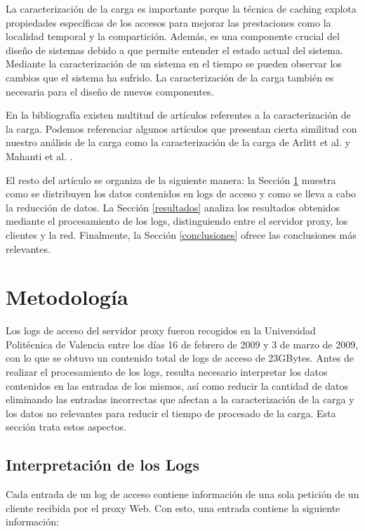 \documentclass[twocolumn]{Jornadas}
\begin{document}
La caracterización de la carga es importante porque la técnica de caching explota propiedades específicas de los accesos para mejorar las prestaciones como la localidad temporal y la compartición. Además, es una componente crucial del diseño de sistemas debido a que permite entender el estado actual del sistema. Mediante la caracterización de un sistema en el tiempo se pueden observar los cambios que el sistema ha sufrido. La caracterización de la carga también es necesaria para el diseño de nuevos componentes.

En la bibliografía existen multitud de artículos referentes a la caracterización de la carga. Podemos referenciar algunos artículos que presentan cierta similitud con nuestro análisis de la carga como la caracterización de la carga de Arlitt et al. \cite{arlitt} y Mahanti et al. \cite{mahanti}.

El resto del artículo se organiza de la siguiente manera: la
Sección \ref{meto} muestra como se distribuyen los datos contenidos en logs de acceso y como se lleva a cabo la reducción de datos. La Sección \ref{resultados} analiza los resultados
obtenidos mediante el procesamiento de los logs, distinguiendo entre el servidor proxy, los clientes y la red. Finalmente, la Sección \ref{conclusiones} ofrece las conclusiones más relevantes.

\section{Metodología}
\label{meto}

Los logs de acceso del servidor proxy fueron recogidos en la Universidad Politécnica de Valencia entre los días 16 de febrero de 2009 y 3 de marzo de 2009, con lo que se obtuvo un contenido total de logs de acceso de 23GBytes. Antes de realizar el procesamiento de los logs, resulta necesario interpretar los datos contenidos en las entradas de los mismos, así como reducir la cantidad de datos eliminando las entradas incorrectas que afectan a la caracterización de la carga y los datos no relevantes para reducir el tiempo de procesado de la carga. Esta sección trata estos aspectos.

\subsection{Interpretación de los Logs}

Cada entrada de un log de acceso contiene información de una sola petición de un cliente recibida por el proxy Web. Con esto, una entrada contiene la siguiente información:
\end{document}
